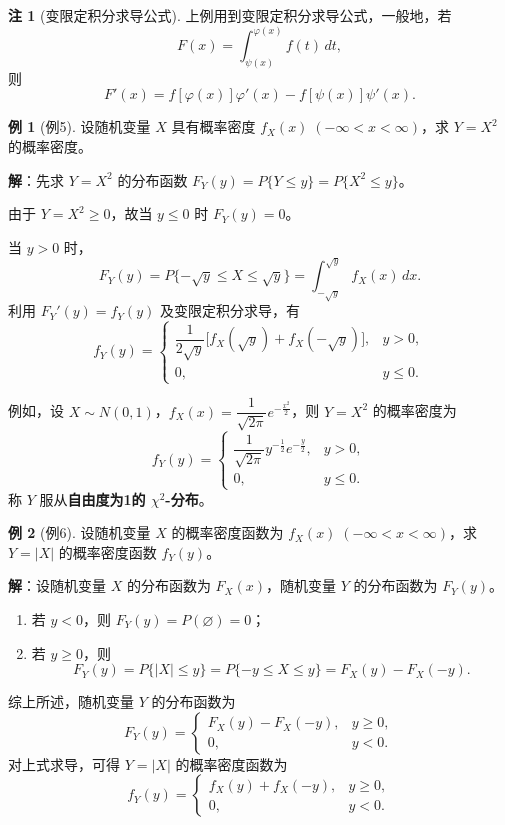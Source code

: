 \documentclass[11pt,a4paper]{report}
\theoremstyle{definition}
\newtheorem{example}{例}[chapter]
\newtheorem{note}{注}[chapter]
\begin{document}
\begin{note}[变限定积分求导公式]
上例用到变限定积分求导公式，一般地，若
\[
F(x) = \int_{\psi(x)}^{\varphi(x)}f(t)\,dt,
\]
则
\[
F'(x) = f[\varphi(x)]\varphi'(x) - f[\psi(x)]\psi'(x).
\]
\end{note}

\begin{example}[例5]
设随机变量 $X$ 具有概率密度 $f_X(x)\;(-\infty < x < \infty)$，求 $Y=X^2$ 的概率密度。
\end{example}

\textbf{解}：先求 $Y=X^2$ 的分布函数 $F_Y(y)=P\{Y \leq y\}=P\{X^2 \leq y\}$。

由于 $Y=X^2 \geq 0$，故当 $y \leq 0$ 时 $F_Y(y)=0$。

当 $y > 0$ 时，
\[
F_Y(y) = P\{-\sqrt{y} \leq X \leq \sqrt{y}\} = \int_{-\sqrt{y}}^{\sqrt{y}}f_X(x)\,dx.
\]
利用 $F_Y'(y)=f_Y(y)$ 及变限定积分求导，有
\[
f_Y(y) = \begin{cases} \dfrac{1}{2\sqrt{y}}\big[f_X(\sqrt{y})+f_X(-\sqrt{y})\big], & y > 0, \\ 0, & y \leq 0. \end{cases}
\]

例如，设 $X \sim N(0,1)$，$f_X(x)=\dfrac{1}{\sqrt{2\pi}}e^{-\frac{x^2}{2}}$，则 $Y=X^2$ 的概率密度为
\[
f_Y(y) = \begin{cases} \dfrac{1}{\sqrt{2\pi}}y^{-\frac{1}{2}}e^{-\frac{y}{2}}, & y > 0, \\ 0, & y \leq 0. \end{cases}
\]
称 $Y$ 服从\textbf{自由度为1的 $\chi^2$-分布}。

\begin{example}[例6]
设随机变量 $X$ 的概率密度函数为 $f_X(x)\;(-\infty < x < \infty)$，求 $Y=|X|$ 的概率密度函数 $f_Y(y)$。
\end{example}

\textbf{解}：设随机变量 $X$ 的分布函数为 $F_X(x)$，随机变量 $Y$ 的分布函数为 $F_Y(y)$。
\begin{enumerate}[label=(\arabic*),leftmargin=2em]
    \item 若 $y < 0$，则 $F_Y(y)=P(\varnothing)=0$；
    \item 若 $y \geq 0$，则
    \[
    F_Y(y) = P\{|X| \leq y\} = P\{-y \leq X \leq y\} = F_X(y)-F_X(-y).
    \]
\end{enumerate}
综上所述，随机变量 $Y$ 的分布函数为
\[
F_Y(y) = \begin{cases} F_X(y)-F_X(-y), & y \geq 0, \\ 0, & y < 0. \end{cases}
\]
对上式求导，可得 $Y=|X|$ 的概率密度函数为
\[
f_Y(y) = \begin{cases} f_X(y)+f_X(-y), & y \geq 0, \\ 0, & y < 0. \end{cases}
\]
\end{document}
